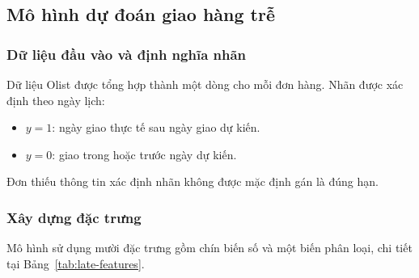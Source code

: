 \documentclass[a4paper]{article}
\begin{document}
\subsection{Mô hình dự đoán giao hàng trễ}
\subsubsection{Dữ liệu đầu vào và định nghĩa nhãn}
Dữ liệu Olist được tổng hợp thành một dòng cho mỗi đơn hàng. Nhãn được xác định theo ngày lịch:
\begin{itemize}
    \item $y=1$: ngày giao thực tế sau ngày giao dự kiến.
    \item $y=0$: giao trong hoặc trước ngày dự kiến.
\end{itemize}
Đơn thiếu thông tin xác định nhãn không được mặc định gán là đúng hạn.

\subsubsection{Xây dựng đặc trưng}
Mô hình sử dụng mười đặc trưng gồm chín biến số và một biến phân loại, chi tiết tại Bảng~\ref{tab:late-features}.
\end{document}
